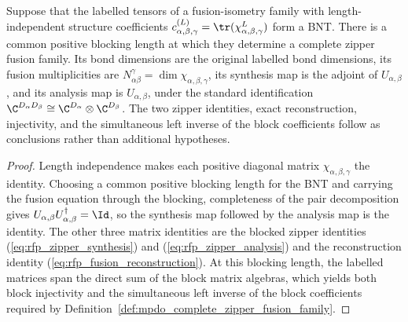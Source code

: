 \begin{lemma}%
    \label{thm:mpdo_blocked_bnt_complete_zipper}
    \leanok
    Suppose that the labelled tensors of a fusion-isometry family with
    length-independent structure coefficients
    $c_{\alpha,\beta,\gamma}^{(L)}
        =\tr(\chi_{\alpha,\beta,\gamma}^{L})$
    form a BNT. There is a common positive blocking length at which they
    determine a complete zipper fusion family. Its
    bond dimensions are the original labelled bond dimensions, its fusion
    multiplicities are
    $N_{\alpha\beta}^{\gamma}=\dim\chi_{\alpha,\beta,\gamma}$,
    its synthesis map is the adjoint of $U_{\alpha,\beta}$, and its analysis
    map is $U_{\alpha,\beta}$, under the standard identification
    $\C^{D_\alpha D_\beta}
        \cong\C^{D_\alpha}\otimes\C^{D_\beta}$.
    The two zipper identities, exact reconstruction, injectivity, and the
    simultaneous left inverse of the block coefficients follow as conclusions
    rather than additional hypotheses.
\end{lemma}
\begin{proof}\leanok
    Length independence makes each positive diagonal matrix
    $\chi_{\alpha,\beta,\gamma}$ the identity. Choosing a common positive
    blocking length for the BNT and carrying the fusion equation through
    the blocking, completeness of the pair decomposition gives
    $U_{\alpha,\beta}U_{\alpha,\beta}^{\dagger}=\Id$, so the synthesis
    map followed by the analysis map is the identity. The other three
    matrix identities are the blocked zipper identities
    (\ref{eq:rfp_zipper_synthesis}) and
    (\ref{eq:rfp_zipper_analysis}) and the reconstruction identity
    (\ref{eq:rfp_fusion_reconstruction}). At this blocking length, the
    labelled matrices span the direct sum of the block matrix algebras,
    which yields both block injectivity and the simultaneous left inverse
    of the block coefficients required by
    Definition~\ref{def:mpdo_complete_zipper_fusion_family}.
\end{proof}

